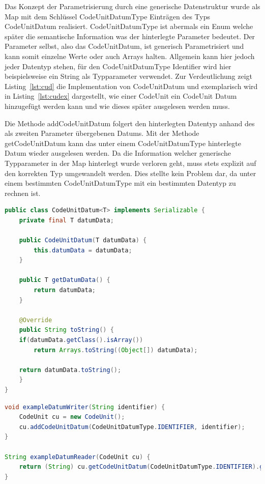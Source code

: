 \documentclass[12pt,oneside,a4paper,parskip]{scrbook}
\begin{document}
Das Konzept der Parametrisierung durch eine generische Datenstruktur wurde als Map mit dem Schlüssel CodeUnitDatumType Einträgen des Typs CodeUnitDatum realisiert. CodeUnitDatumType ist abermals ein Enum welche später die semantische Information was der hinterlegte Parameter bedeutet. Der Parameter selbst, also das CodeUnitDatum, ist generisch Parametrisiert und kann somit einzelne Werte oder auch Arrays halten. Allgemein kann hier jedoch jeder Datentyp stehen, für den CodeUnitDatumType Identifier wird hier beispielsweise ein String als Typparameter verwendet. Zur Verdeutlichung zeigt Listing~\ref{lst:cud} die Implementation von CodeUnitDatum und exemplarisch wird in Listing~\ref{lst:cudex} dargestellt, wie einer CodeUnit ein CodeUnit Datum hinzugefügt werden kann und wie dieses später ausgelesen werden muss. 

Die Methode addCodeUnitDatum folgert den hinterlegten Datentyp anhand des als zweiten Parameter übergebenen Datums. Mit der Methode getCodeUnitDatum kann das unter einem CodeUnitDatumType hinterlegte Datum wieder ausgelesen werden. Da die Information welcher generische Typparameter in der Map hinterlegt wurde verloren geht, muss stets explizit auf den korrekten Typ umgewandelt werden. Dies stellte kein Problem dar, da unter einem bestimmten CodeUnitDatumType mit ein bestimmten Datentyp zu rechnen ist.

\begin{lstlisting}[label=lst:cud,
language=java,
firstnumber=1,
caption=Implementation der Klasse CodeUnitDatum.]
public class CodeUnitDatum<T> implements Serializable {
	private final T datumData;

	public CodeUnitDatum(T datumData) {
		this.datumData = datumData;
	}

	public T getDatumData() {
		return datumData;
	}

	@Override
	public String toString() {
	if(datumData.getClass().isArray())
		return Arrays.toString((Object[]) datumData);

	return datumData.toString();
	}
}
\end{lstlisting}

\begin{lstlisting}[label=lst:cudex,
language=java,
firstnumber=1,
caption=Beispiel zum konkreten hinterlegen und auslesen eines CodeUnitDatums.]
void exampleDatumWriter(String identifier) {
	CodeUnit cu = new CodeUnit();
	cu.addCodeUnitDatum(CodeUnitDatumType.IDENTIFIER, identifier);
}

String exampleDatumReader(CodeUnit cu) {
	return (String) cu.getCodeUnitDatum(CodeUnitDatumType.IDENTIFIER).getDatumData(); 
}
\end{lstlisting}
\end{document}
